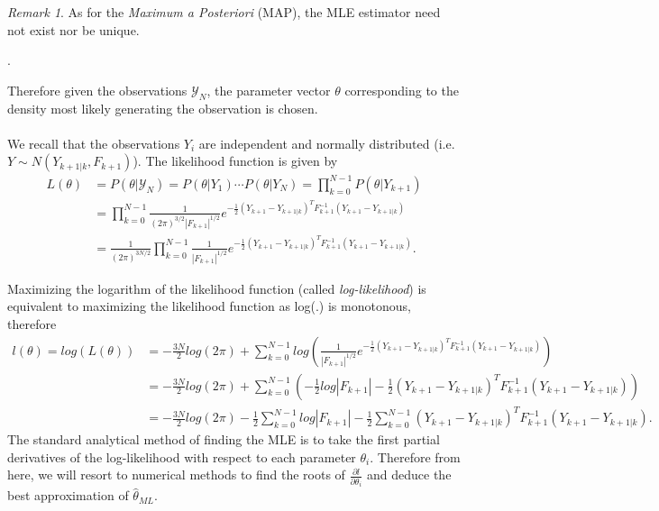 \documentclass{article}
\theoremstyle{definition}
\theoremstyle{remark}
\newtheorem{remark}[thm]{Remark}
\newcommand{\filtrationObs}[1]{\ensuremath{\mathscr{Y}_{#1}}}
\begin{document}
\begin{remark}
As for the \emph{Maximum a Posteriori} (MAP), the MLE estimator need not exist nor be unique.
\end{remark}
{\tiny .}

Therefore given the observations $\filtrationObs{N}$, the parameter vector $\theta$ corresponding to the density most likely generating the observation is chosen. \\
\\
We recall that the observations $Y_i$ are independent and normally distributed (i.e. $Y\sim N(Y_{k+1|k},F_{k+1})$). The likelihood function is given by
\begin{align*}
L(\theta)&=P(\theta|\filtrationObs{N})=P(\theta|Y_1)\cdots P(\theta|Y_{N})=\prod_{k=0}^{N-1}P(\theta|Y_{k+1})\\%
&=\prod_{k=0}^{N-1}\frac{1}{(2\pi)^{3/2}|F_{k+1}|^{1/2}}e^{-\frac{1}{2}(Y_{k+1}-Y_{k+1|k})^TF_{k+1}^{-1}(Y_{k+1}-Y_{k+1|k})}\\
&=\frac{1}{(2\pi)^{3N/2}}\prod_{k=0}^{N-1}\frac{1}{|F_{k+1}|^{1/2}}e^{-\frac{1}{2}(Y_{k+1}-Y_{k+1|k})^TF_{k+1}^{-1}(Y_{k+1}-Y_{k+1|k})}.
\end{align*}

Maximizing the logarithm of the likelihood function (called \textit{log-likelihood}) is equivalent to maximizing the likelihood function as log(.) is monotonous, therefore
\begin{align*}
l(\theta)=log(L(\theta))&=-\frac{3N}{2}log(2\pi) + \sum_{k=0}^{N-1}log\left( \frac{1}{|F_{k+1}|^{1/2}}e^{-\frac{1}{2}(Y_{k+1}-Y_{k+1|k})^TF_{k+1}^{-1}(Y_{k+1}-Y_{k+1|k})} \right)\\
%
&=-\frac{3N}{2}log(2\pi) + \sum_{k=0}^{N-1}\left( -\frac{1}{2}log|F_{k+1}|-\frac{1}{2}(Y_{k+1}-Y_{k+1|k})^TF_{k+1}^{-1}(Y_{k+1}-Y_{k+1|k}) \right) \\
%
&=-\frac{3N}{2}log(2\pi) - \frac{1}{2}\sum_{k=0}^{N-1}log|F_{k+1}|-\frac{1}{2}\sum_{k=0}^{N-1}(Y_{k+1}-Y_{k+1|k})^TF_{k+1}^{-1}(Y_{k+1}-Y_{k+1|k}).
\end{align*}
The standard analytical method of finding the MLE is to take the first partial derivatives of the
log-likelihood with respect to each parameter $\theta_i$. Therefore from here, we will resort to numerical methods to find the roots of $\frac{\partial l}{\partial \theta_i}$ and deduce the best approximation of $\hat{\theta}_{ML}$.
\end{document}
